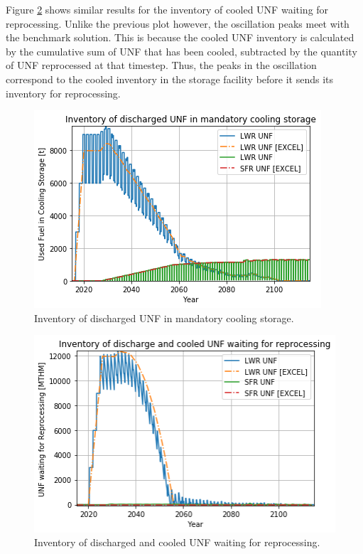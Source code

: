 Figure \ref{fig:waiting_monthly} shows similar results for the inventory of cooled
\gls{UNF} waiting for reprocessing.
Unlike the previous plot however, the oscillation peaks meet with the benchmark
solution.  This is because the cooled \gls{UNF} inventory is calculated by the cumulative sum
of \gls{UNF} that has been cooled, subtracted by the quantity of \gls{UNF} reprocessed at that timestep.
Thus, the peaks in the oscillation correspond to the cooled inventory in the storage
facility before it sends its inventory for reprocessing.

\begin{figure}[htbp!]
    \begin{center}
        \includegraphics[scale=0.5]{./images/results_18/fuel_discharge_monthly.png}
    \end{center}
        \caption{Inventory of discharged \gls{UNF} in mandatory cooling storage.}
    \label{fig:fuel_discharge_monthly}
\end{figure}


\begin{figure}[htbp!]
    \begin{center}
        \includegraphics[scale=0.5]{./images/results_18/waiting_monthly.png}
    \end{center}
        \caption{Inventory of discharged and cooled \gls{UNF} waiting for reprocessing.}
    \label{fig:waiting_monthly}
\end{figure}


